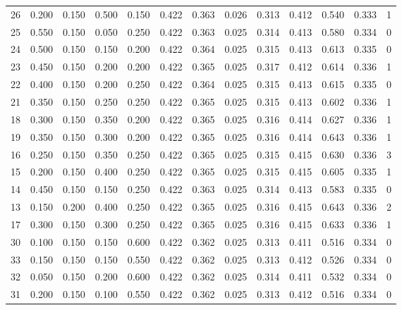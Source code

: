 \begin{landscape}
\begin{table}[htbp]
{\begin{tabular}{lrrrrrrrrrrrr}
26 & 0.200 & 0.150 & 0.500 & 0.150 & 0.422 & 0.363 & 0.026 & 0.313 & 0.412 & 0.540 & 0.333 & 1 \\
25 & 0.550 & 0.150 & 0.050 & 0.250 & 0.422 & 0.363 & 0.025 & 0.314 & 0.413 & 0.580 & 0.334 & 0 \\
24 & 0.500 & 0.150 & 0.150 & 0.200 & 0.422 & 0.364 & 0.025 & 0.315 & 0.413 & 0.613 & 0.335 & 0 \\
23 & 0.450 & 0.150 & 0.200 & 0.200 & 0.422 & 0.365 & 0.025 & 0.317 & 0.412 & 0.614 & 0.336 & 1 \\
22 & 0.400 & 0.150 & 0.200 & 0.250 & 0.422 & 0.364 & 0.025 & 0.315 & 0.413 & 0.615 & 0.335 & 0 \\
21 & 0.350 & 0.150 & 0.250 & 0.250 & 0.422 & 0.365 & 0.025 & 0.315 & 0.413 & 0.602 & 0.336 & 1 \\
18 & 0.300 & 0.150 & 0.350 & 0.200 & 0.422 & 0.365 & 0.025 & 0.316 & 0.414 & 0.627 & 0.336 & 1 \\
19 & 0.350 & 0.150 & 0.300 & 0.200 & 0.422 & 0.365 & 0.025 & 0.316 & 0.414 & 0.643 & 0.336 & 1 \\
16 & 0.250 & 0.150 & 0.350 & 0.250 & 0.422 & 0.365 & 0.025 & 0.315 & 0.415 & 0.630 & 0.336 & 3 \\
15 & 0.200 & 0.150 & 0.400 & 0.250 & 0.422 & 0.365 & 0.025 & 0.315 & 0.415 & 0.605 & 0.335 & 1 \\
14 & 0.450 & 0.150 & 0.150 & 0.250 & 0.422 & 0.363 & 0.025 & 0.314 & 0.413 & 0.583 & 0.335 & 0 \\
13 & 0.150 & 0.200 & 0.400 & 0.250 & 0.422 & 0.365 & 0.025 & 0.316 & 0.415 & 0.643 & 0.336 & 2 \\
17 & 0.300 & 0.150 & 0.300 & 0.250 & 0.422 & 0.365 & 0.025 & 0.316 & 0.415 & 0.633 & 0.336 & 1 \\
30 & 0.100 & 0.150 & 0.150 & 0.600 & 0.422 & 0.362 & 0.025 & 0.313 & 0.411 & 0.516 & 0.334 & 0 \\
33 & 0.150 & 0.150 & 0.150 & 0.550 & 0.422 & 0.362 & 0.025 & 0.313 & 0.412 & 0.526 & 0.334 & 0 \\
32 & 0.050 & 0.150 & 0.200 & 0.600 & 0.422 & 0.362 & 0.025 & 0.314 & 0.411 & 0.532 & 0.334 & 0 \\
31 & 0.200 & 0.150 & 0.100 & 0.550 & 0.422 & 0.362 & 0.025 & 0.313 & 0.412 & 0.516 & 0.334 & 0 \\
\bottomrule
\end{tabular}
}
\end{table}
\end{landscape}
